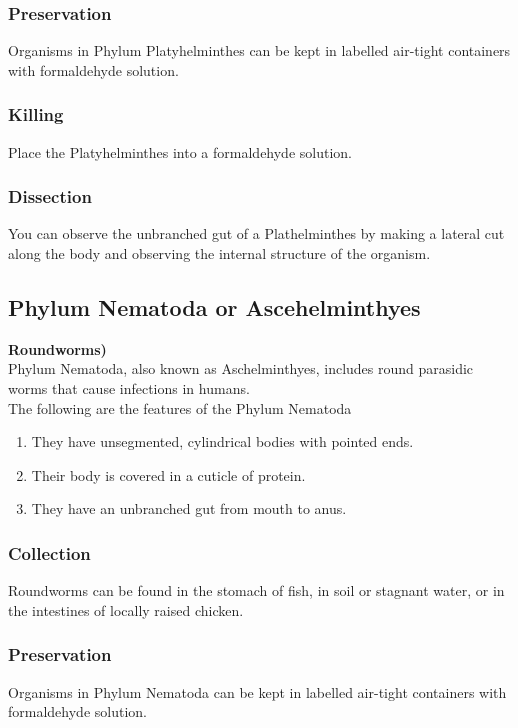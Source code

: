 \subsubsection{Preservation} 
Organisms in Phylum Platyhelminthes can be kept in labelled air-tight containers with formaldehyde solution.

\subsubsection{Killing}
Place the Platyhelminthes into a formaldehyde solution.

\subsubsection{Dissection}
You can observe the unbranched gut of a Plathelminthes by making a lateral cut along the body and observing the internal structure of the organism.

\subsection{Phylum Nematoda or Ascehelminthyes}

\textbf{Roundworms)}\\
Phylum Nematoda, also known as Aschelminthyes, includes round parasidic worms that cause infections in humans.\\
The following are the features of the Phylum Nematoda 
\begin{enumerate}
\item{They have unsegmented, cylindrical bodies with pointed ends.}
\item{Their body is covered in a cuticle of protein.}
\item{They have an unbranched gut from mouth to anus.}
\end{enumerate}

\subsubsection{Collection}
Roundworms can be found in the stomach of fish, in soil or stagnant water, or in the intestines of locally raised chicken.

\subsubsection{Preservation} 
Organisms in Phylum Nematoda can be kept in labelled air-tight containers with formaldehyde solution.

